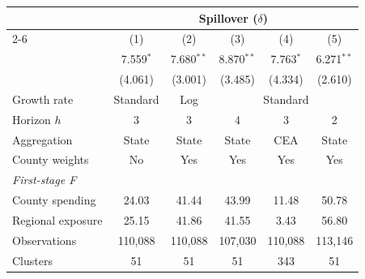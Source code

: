 \begin{tabular}{@{}lccccc@{}}
\toprule
 & \multicolumn{5}{c}{Spillover ($\delta$)} \\
\cmidrule(lr){2-6}
 & (1) & (2) & (3) & (4) & (5) \\
\midrule
 & 7.559$^{*}$ & 7.680$^{**}$ & 8.870$^{**}$ & 7.763$^{*}$ & 6.271$^{**}$ \\
 & (4.061) & (3.001) & (3.485) & (4.334) & (2.610) \\
\addlinespace[8pt]
Growth rate & Standard & Log & \multicolumn{3}{c}{Standard} \\
Horizon $h$ & 3 & 3 & 4 & 3 & 2 \\
Aggregation & State & State & State & CEA & State \\
County weights & No & Yes & Yes & Yes & Yes \\
\addlinespace[12pt]
\textit{First-stage F} &  &  &  &  &  \\
\hspace{1em}County spending & 24.03 & 41.44 & 43.99 & 11.48 & 50.78 \\
\hspace{1em}Regional exposure & 25.15 & 41.86 & 41.55 & 3.43 & 56.80 \\
\addlinespace[12pt]
Observations & 110,088 & 110,088 & 107,030 & 110,088 & 113,146 \\
Clusters & 51 & 51 & 51 & 343 & 51 \\
\bottomrule\end{tabular}
